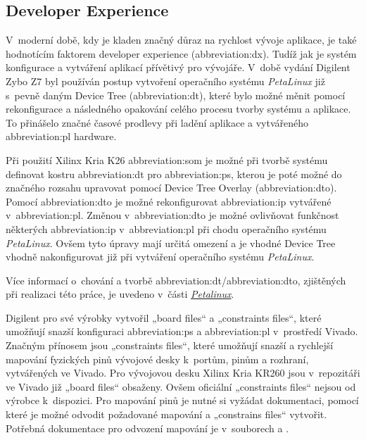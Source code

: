 \documentclass[a4paper, twoside, 11pt]{article}
\begin{document}
			\subsection{Developer Experience}
					V~moderní době, kdy je kladen značný důraz na rychlost vývoje aplikace, je také hodnotícím faktorem developer experience (\gls{abbreviation:dx}). Tudíž jak je systém konfigurace a vytváření aplikací přívětivý pro vývojáře. V~době vydání Digilent Zybo Z7 byl používán postup vytvoření operačního systému \textit{PetaLinux} již s~pevně daným Device Tree (\gls{abbreviation:dt}), které bylo možné měnit pomocí rekonfigurace a následného opakování celého procesu tvorby systému a aplikace. To přinášelo značné časové prodlevy při ladění aplikace a vytvářeného \gls{abbreviation:pl} hardware.\par
					Při použití Xilinx Kria K26 \gls{abbreviation:som} je možné při tvorbě systému definovat kostru \gls{abbreviation:dt} pro \gls{abbreviation:ps}, kterou je poté možné do značného rozsahu upravovat pomocí Device Tree Overlay (\gls{abbreviation:dto}). Pomocí \gls{abbreviation:dto} je možné rekonfigurovat \gls{abbreviation:ip} vytvářené v~\gls{abbreviation:pl}. Změnou v~\gls{abbreviation:dto} je možné ovlivňovat funkčnost některých \gls{abbreviation:ip} v~\gls{abbreviation:pl} při chodu operačního systému \textit{PetaLinux}. Ovšem tyto úpravy mají určitá omezení a je vhodné Device Tree vhodně nakonfigurovat již při vytváření operačního systému \textit{PetaLinux}.\par
					Více informací o~chování a tvorbě \gls{abbreviation:dt}/\gls{abbreviation:dto}, zjištěných při realizaci této práce, je uvedeno v~části \hyperref[subsubsec:konfigurace-device-tree]{\textit{Petalinux}}.\par
					Digilent pro své výrobky vytvořil „board files“ a „constraints files“, které umožňují snazší konfiguraci \gls{abbreviation:ps} a \gls{abbreviation:pl} v~prostředí Vivado. Značným přínosem jsou „constraints files“, které umožňují snazší a rychlejší mapování fyzických pinů vývojové desky k~portům, pinům a rozhraní, vytvářených ve Vivado. Pro vývojovou desku Xilinx Kria KR260 jsou v~repozitáři ve Vivado již „board files“ obsaženy. Ovšem oficiální „constraints files“ nejsou od výrobce k~dispozici. Pro mapování pinů je nutné si vyžádat dokumentaci, pomocí které je možné odvodit požadované mapování a „constrains files“ vytvořit. Potřebná dokumentace pro odvození mapování je v~souborech \cite{kria-kr260-starter-kit-cc-schematics} a \cite{kria-k26-som-xdc}.
\end{document}
